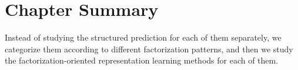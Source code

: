\section{Chapter Summary}
Instead of studying the structured prediction for each of them
separately, we categorize them according to different factorization
patterns, and then we study the factorization-oriented representation
learning methods for each of them.


